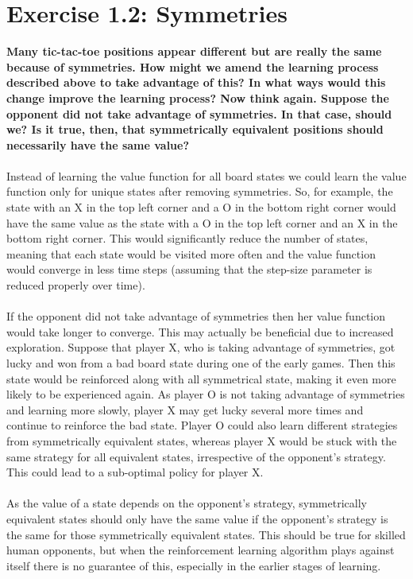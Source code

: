 \documentclass[a4paper,11pt]{article}
\numberwithin{equation}{section}
\theoremstyle{remark}
\begin{document}
\section{Exercise 1.2: Symmetries}

\textbf{Many tic-tac-toe positions appear different but are really the same because of symmetries. How might we amend the learning process described above to take advantage of this? In what ways would this change improve the learning process? Now think again. Suppose the opponent did not take advantage of symmetries. In that case, should we? Is it true, then, that symmetrically equivalent positions should necessarily have the same value?}
\\ \\
Instead of learning the value function for all board states we could learn the value function only for unique states after removing symmetries. So, for example, the state with an X in the top left corner and a O in the bottom right corner would have the same value as the state with a O in the top left corner and an X in the bottom right corner. This would significantly reduce the number of states, meaning that each state would be visited more often and the value function would converge in less time steps (assuming that the step-size parameter is reduced properly over time).  
\\ \\
If the opponent did not take advantage of symmetries then her value function would take longer to converge. This may actually be beneficial due to increased exploration. Suppose that player X, who is taking advantage of symmetries, got lucky and won from a bad board state during one of the early games. Then this state would be reinforced along with all symmetrical state, making it even more likely to be experienced again. As player O is not taking advantage of symmetries and learning more slowly, player X may get lucky several more times and continue to reinforce the bad state. Player O could also learn different strategies from symmetrically equivalent states, whereas player X would be stuck with the same strategy for all equivalent states, irrespective of the opponent's strategy. This could lead to a sub-optimal policy for player X. 
\\ \\
As the value of a state depends on the opponent's strategy, symmetrically equivalent states should only have the same value if the opponent's strategy is the same for those symmetrically equivalent states. This should be true for skilled human opponents, but when the reinforcement learning algorithm plays against itself there is no guarantee of this, especially in the earlier stages of learning.  
 
\end{document}
